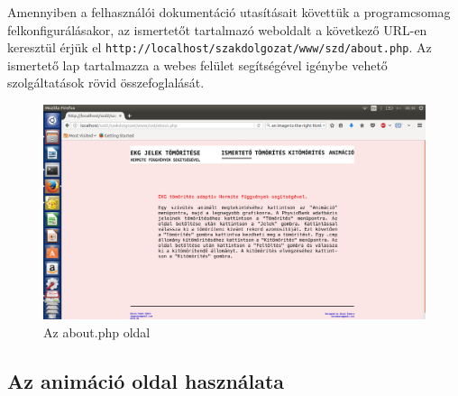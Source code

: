 \documentclass[oneside,titlepage,12pt,a4paper]{report}
\begin{document}
Amennyiben a felhasználói dokumentáció utasításait követtük a programcsomag felkonfigurálásakor, az ismertetőt tartalmazó weboldalt a következő URL-en keresztül érjük el \texttt{http://localhost/szakdolgozat/www/szd/about.php}. Az ismertető lap tartalmazza a webes felület segítségével igénybe vehető szolgáltatások rövid összefoglalását. 

\begin{figure}[H]
\begin{center}
  \includegraphics[width=150mm]{./Abrak/WWW/about.png}
  \caption{Az about.php oldal}
\end{center}
\end{figure}

\subsection*{Az animáció oldal használata}
\end{document}
